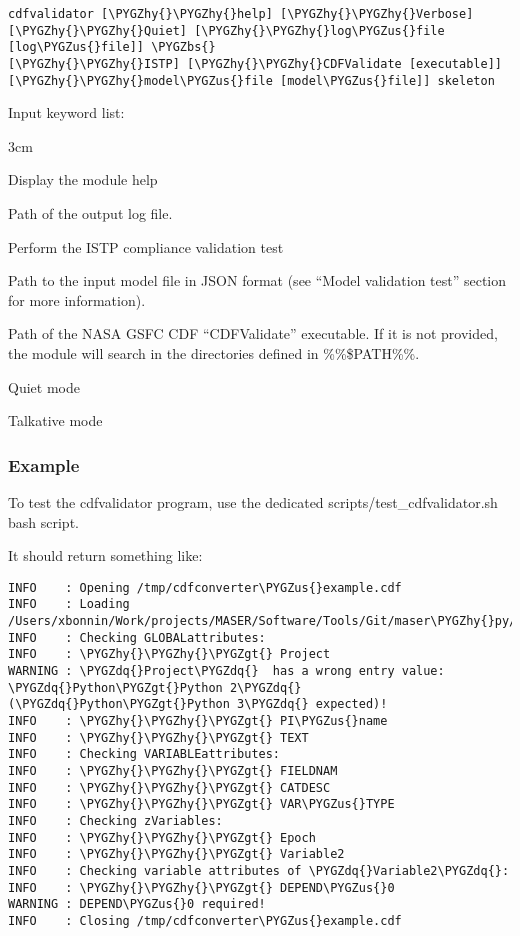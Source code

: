 \documentclass[letterpaper,10pt,english]{sphinxmanual}
\def\PYGZbs{\char`\\}
\def\PYGZus{\char`\_}
\def\PYGZgt{\char`\>}
\def\PYGZhy{\char`\-}
\def\PYGZdq{\char`\"}
\begin{document}
\begin{Verbatim}[commandchars=\\\{\}]
cdfvalidator [\PYGZhy{}\PYGZhy{}help] [\PYGZhy{}\PYGZhy{}Verbose] [\PYGZhy{}\PYGZhy{}Quiet] [\PYGZhy{}\PYGZhy{}log\PYGZus{}file [log\PYGZus{}file]] \PYGZbs{}
[\PYGZhy{}\PYGZhy{}ISTP] [\PYGZhy{}\PYGZhy{}CDFValidate [executable]] [\PYGZhy{}\PYGZhy{}model\PYGZus{}file [model\PYGZus{}file]] skeleton
\end{Verbatim}

Input keyword list:
\begin{optionlist}{3cm}
\item [-h, -help]  
Display the module help
\item [-l, -{-}log\_file]  
Path of the output log file.
\item [-I, -{-}ISTP]  
Perform the ISTP compliance validation test
\item [-m, -{-}model\_file]  
Path to the input model file in JSON format
(see ``Model validation test'' section for more information).
\item [-C, -{-}CDFValidate executable]  
Path of the NASA GSFC CDF ``CDFValidate'' executable.
If it is not provided, the module will
search in the directories defined in \%\%\$PATH\%\%.
\item [-Q, -{-}Quiet]  
Quiet mode
\item [-V, -{-}Verbose]  
Talkative mode
\end{optionlist}


\subsubsection{Example}
\label{cdf:id4}
To test the cdfvalidator program, use the dedicated scripts/test\_cdfvalidator.sh bash script.

It should return something like:

\begin{Verbatim}[commandchars=\\\{\}]
INFO    : Opening /tmp/cdfconverter\PYGZus{}example.cdf
INFO    : Loading /Users/xbonnin/Work/projects/MASER/Software/Tools/Git/maser\PYGZhy{}py/scripts/../maser/support/cdf/cdfvalidator\PYGZus{}model\PYGZus{}example.json
INFO    : Checking GLOBALattributes:
INFO    : \PYGZhy{}\PYGZhy{}\PYGZgt{} Project
WARNING : \PYGZdq{}Project\PYGZdq{}  has a wrong entry value: \PYGZdq{}Python\PYGZgt{}Python 2\PYGZdq{} (\PYGZdq{}Python\PYGZgt{}Python 3\PYGZdq{} expected)!
INFO    : \PYGZhy{}\PYGZhy{}\PYGZgt{} PI\PYGZus{}name
INFO    : \PYGZhy{}\PYGZhy{}\PYGZgt{} TEXT
INFO    : Checking VARIABLEattributes:
INFO    : \PYGZhy{}\PYGZhy{}\PYGZgt{} FIELDNAM
INFO    : \PYGZhy{}\PYGZhy{}\PYGZgt{} CATDESC
INFO    : \PYGZhy{}\PYGZhy{}\PYGZgt{} VAR\PYGZus{}TYPE
INFO    : Checking zVariables:
INFO    : \PYGZhy{}\PYGZhy{}\PYGZgt{} Epoch
INFO    : \PYGZhy{}\PYGZhy{}\PYGZgt{} Variable2
INFO    : Checking variable attributes of \PYGZdq{}Variable2\PYGZdq{}:
INFO    : \PYGZhy{}\PYGZhy{}\PYGZgt{} DEPEND\PYGZus{}0
WARNING : DEPEND\PYGZus{}0 required!
INFO    : Closing /tmp/cdfconverter\PYGZus{}example.cdf
\end{Verbatim}
\end{document}
